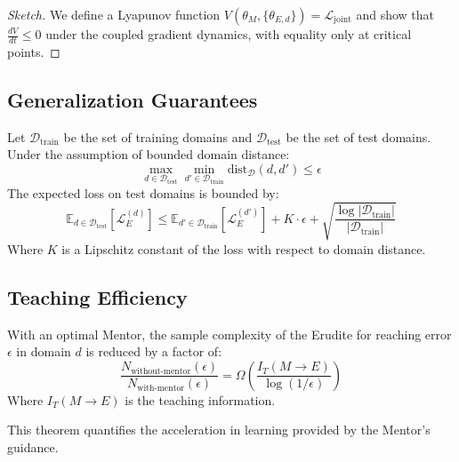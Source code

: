 \begin{proof}[Sketch]
We define a Lyapunov function $V(\theta_M, \{\theta_{E,d}\}) = \mathcal{L}_{\text{joint}}$ and show that $\frac{dV}{dt} \leq 0$ under the coupled gradient dynamics, with equality only at critical points.
\end{proof}

\subsection{Generalization Guarantees}

\begin{theorem}
Let $\mathcal{D}_{\text{train}}$ be the set of training domains and $\mathcal{D}_{\text{test}}$ be the set of test domains. Under the assumption of bounded domain distance:
\begin{equation}
\max_{d \in \mathcal{D}_{\text{test}}} \min_{d' \in \mathcal{D}_{\text{train}}} \text{dist}_{\mathcal{D}}(d, d') \leq \epsilon
\end{equation}
The expected loss on test domains is bounded by:
\begin{equation}
\mathbb{E}_{d \in \mathcal{D}_{\text{test}}} [\mathcal{L}_E^{(d)}] \leq \mathbb{E}_{d' \in \mathcal{D}_{\text{train}}} [\mathcal{L}_E^{(d')}] + K \cdot \epsilon + \sqrt{\frac{\log|\mathcal{D}_{\text{train}}|}{|\mathcal{D}_{\text{train}}|}}
\end{equation}
Where $K$ is a Lipschitz constant of the loss with respect to domain distance.
\end{theorem}

\subsection{Teaching Efficiency}

\begin{theorem}
With an optimal Mentor, the sample complexity of the Erudite for reaching error $\epsilon$ in domain $d$ is reduced by a factor of:
\begin{equation}
\frac{N_{\text{without-mentor}}(\epsilon)}{N_{\text{with-mentor}}(\epsilon)} = \Omega\left(\frac{I_T(M \rightarrow E)}{\log(1/\epsilon)}\right)
\end{equation}
Where $I_T(M \rightarrow E)$ is the teaching information.
\end{theorem}

This theorem quantifies the acceleration in learning provided by the Mentor's guidance.

